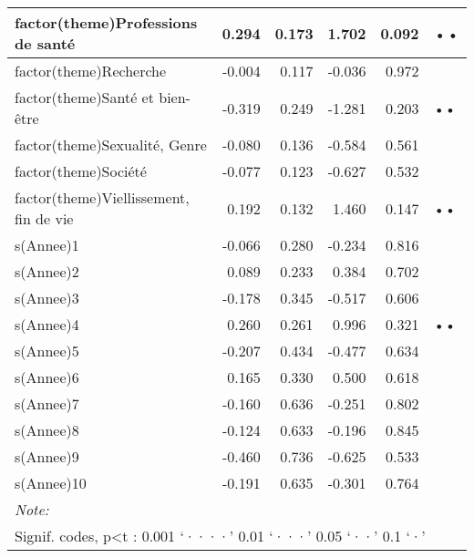 \documentclass[
  letterpaper,
  DIV=11,
  numbers=noendperiod]{scrartcl}
\begin{document}
\begin{table}
\begin{minipage}[t]{\linewidth}
{\begin{tabular}[t]{l|r|r|r|r|l}
\hline
factor(theme)Professions de santé & 0.294 & 0.173 & 1.702 & 0.092 & ••\\
\hline
factor(theme)Recherche & -0.004 & 0.117 & -0.036 & 0.972 & \\
\hline
factor(theme)Santé et bien-être & -0.319 & 0.249 & -1.281 & 0.203 & ••\\
\hline
factor(theme)Sexualité, Genre & -0.080 & 0.136 & -0.584 & 0.561 & \\
\hline
factor(theme)Société & -0.077 & 0.123 & -0.627 & 0.532 & \\
\hline
factor(theme)Viellissement, fin de vie & 0.192 & 0.132 & 1.460 & 0.147 & ••\\
\hline
s(Annee)1 & -0.066 & 0.280 & -0.234 & 0.816 & \\
\hline
s(Annee)2 & 0.089 & 0.233 & 0.384 & 0.702 & \\
\hline
s(Annee)3 & -0.178 & 0.345 & -0.517 & 0.606 & \\
\hline
s(Annee)4 & 0.260 & 0.261 & 0.996 & 0.321 & ••\\
\hline
s(Annee)5 & -0.207 & 0.434 & -0.477 & 0.634 & \\
\hline
s(Annee)6 & 0.165 & 0.330 & 0.500 & 0.618 & \\
\hline
s(Annee)7 & -0.160 & 0.636 & -0.251 & 0.802 & \\
\hline
s(Annee)8 & -0.124 & 0.633 & -0.196 & 0.845 & \\
\hline
s(Annee)9 & -0.460 & 0.736 & -0.625 & 0.533 & \\
\hline
s(Annee)10 & -0.191 & 0.635 & -0.301 & 0.764 & \\
\hline
\multicolumn{6}{l}{\rule{0pt}{1em}\textit{Note: }}\\
\multicolumn{6}{l}{\rule{0pt}{1em}Signif. codes, p<t : 0.001 ‘····’ 0.01 ‘···’ 0.05 ‘··’ 0.1 ‘·’ }\\
\end{tabular}

}

\end{minipage}%
\newline
\begin{minipage}[t]{\linewidth}

{\centering 

}
\end{minipage}
\end{table}
\end{document}
